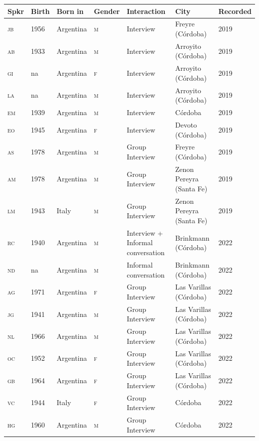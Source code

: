 \documentclass[output=paper]{langscibook}
\begin{document}
\begin{table}
\footnotesize
\begin{tabularx}{\textwidth}{llllQQl}
\lsptoprule
Spkr & Birth & Born in & Gender &   Interaction & City  & Recorded\\
\midrule
\textsc{jb} & 1956 & {Argentina} & \textsc{m} & Interview & Freyre (Córdoba) & 2019\\
\textsc{ab} & 1933 & {Argentina} & \textsc{m} & Interview & Arroyito (Córdoba) & 2019\\
\textsc{gi} & na & {Argentina} & \textsc{f} & Interview & Arroyito (Córdoba) & 2019\\
\textsc{la} & na & {Argentina} & \textsc{m} & Interview & Arroyito (Córdoba) & 2019\\
\textsc{em} & 1939 & {Argentina} & \textsc{m} & Interview & Córdoba & 2019\\
\textsc{eo} & 1945 & {Argentina} & \textsc{f} & Interview & Devoto (Córdoba) & { 2019}\\
\textsc{as} & 1978 & {Argentina} & \textsc{m} & Group Interview & Freyre (Córdoba) & {2019}\\
\textsc{am} & 1978 & {Argentina} & \textsc{m} & Group Interview & Zenon Pereyra (Santa Fe) & {2019}\\
\textsc{lm} & 1943 & {Italy} & \textsc{m} & Group Interview & { Zenon Pereyra (Santa Fe)} & {2019}\\
\textsc{rc} & 1940 & {Argentina} & \textsc{m} & Interview + Informal conversation & Brinkmann (Córdoba) & 2022\\
\textsc{nd} & na & {Argentina} & \textsc{m} & Informal conversation & {Brinkmann (Córdoba)} & {2022}\\
\textsc{ag} & 1971 & {Argentina} & {\textsc{f}} & {Group Interview} & Las Varillas (Córdoba) & {2022}\\
\textsc{jg} & 1941 & {Argentina} & {\textsc{m}} & {Group Interview} & {Las Varillas (Córdoba)} & {2022}\\
\textsc{nl} & 1966 & {Argentina} & {\textsc{m}} & {Group Interview} & {Las Varillas (Córdoba)} & {2022}\\
\textsc{oc} & 1952 & {Argentina} & {\textsc{f}} & {Group Interview} & {Las Varillas (Córdoba)} & {2022}\\
\textsc{gb} & 1964 & {Argentina} & {\textsc{f}} & {Group Interview} & {Las Varillas (Córdoba)} & {2022}\\
\textsc{vc} & 1944 & Italy & \textsc{f} & {Group Interview} & Córdoba & {2022}\\
\textsc{hg} & 1960 & Argentina & \textsc{m} & {Group Interview} & {Córdoba} & {2022}\\

\end{tabularx}
\end{table}
\end{document}
